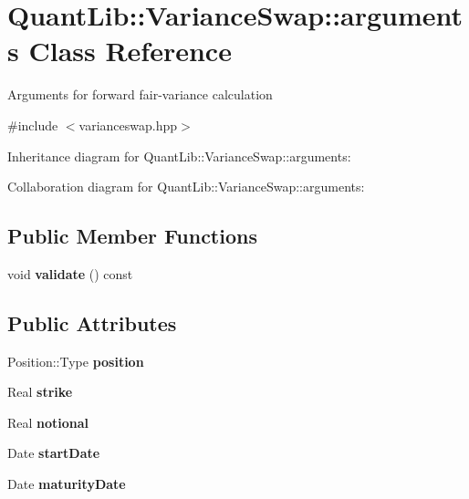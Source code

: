\section{Quant\+Lib\+:\+:Variance\+Swap\+:\+:arguments Class Reference}
\label{class_quant_lib_1_1_variance_swap_1_1arguments}


Arguments for forward fair-\/variance calculation  




{\ttfamily \#include $<$varianceswap.\+hpp$>$}



Inheritance diagram for Quant\+Lib\+:\+:Variance\+Swap\+:\+:arguments\+:


Collaboration diagram for Quant\+Lib\+:\+:Variance\+Swap\+:\+:arguments\+:
\subsection*{Public Member Functions}
\begin{DoxyCompactItemize}
\item 
void {\bfseries validate} () const \label{class_quant_lib_1_1_variance_swap_1_1arguments_a4956b6f66f829ca4458808ff23c63888}

\end{DoxyCompactItemize}
\subsection*{Public Attributes}
\begin{DoxyCompactItemize}
\item 
Position\+::\+Type {\bfseries position}\label{class_quant_lib_1_1_variance_swap_1_1arguments_abcba588a3c6bb169cf8e2c586f1e0f67}

\item 
Real {\bfseries strike}\label{class_quant_lib_1_1_variance_swap_1_1arguments_a04348272a6577cf74a0ca73d4266da92}

\item 
Real {\bfseries notional}\label{class_quant_lib_1_1_variance_swap_1_1arguments_acadb30515891d474bb15c50cd9e030f9}

\item 
Date {\bfseries start\+Date}\label{class_quant_lib_1_1_variance_swap_1_1arguments_a84cd6517a21db9f8fb0e4b5128336738}

\item 
Date {\bfseries maturity\+Date}\label{class_quant_lib_1_1_variance_swap_1_1arguments_a2476e29fc8c4afab772da940de553efa}

\end{DoxyCompactItemize}


